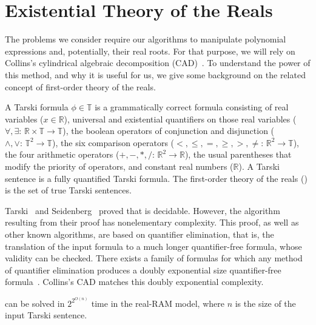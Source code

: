 \section{Existential Theory of the Reals}


The problems we consider require our algorithms to manipulate polynomial
expressions and, potentially, their real roots. For that purpose, we will rely
on Collins's cylindrical algebraic decomposition (CAD)~\cite{C75}.
%
To understand the power of this method, and why it is useful for us, we give some
background on the related concept of first-order theory of the reals.

\begin{definition}
	A Tarski formula $\phi \in \mathbb{T}$ is a grammatically correct formula
	consisting of real variables ($x \in \mathbb{R}$), universal and
	existential quantifiers on those real variables
	($\forall,\exists\colon\,\mathbb{R}\times\mathbb{T}\to\mathbb{T}$), the
	boolean operators of conjunction and disjunction
	($\land,\lor\colon\,\mathbb{T}^2\to\mathbb{T}$), the six comparison
	operators ($<,\le,=,\ge,>,\ne\colon\,\mathbb{R}^2\to\mathbb{T}$), the four
	arithmetic operators ($+,-,*,/\colon\,\mathbb{R}^2\to\mathbb{R}$), the
	usual parentheses that modify the priority of operators, and constant real
	numbers (\(\mathbb{R}\)).
	A Tarski sentence is a fully quantified Tarski formula.
	The first-order theory of the reals (\FOTR{}) is
	the set of true Tarski sentences.
\end{definition}

Tarski~\cite{T51} and Seidenberg~\cite{Sei74} proved that \FOTR{} is decidable.
However, the algorithm resulting from their proof has nonelementary complexity.
%
This proof, as well as other known algorithms, are based on quantifier
elimination, that is, the translation of the input formula to a much longer
quantifier-free formula, whose validity can be checked.
There exists a family of formulas for which any method of quantifier elimination
produces a doubly exponential size quantifier-free formula~\cite{DH88}.
%
Collins's CAD matches this doubly exponential complexity.
\begin{theorem}
	\FOTR{} can be solved in $2^{2^{O(n)}}$ time in the real-RAM model, where
	\(n\) is the size of the input Tarski sentence.
\end{theorem}

